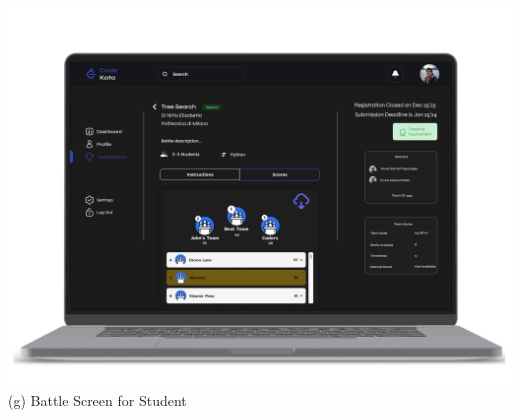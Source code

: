\begin{center}
\includegraphics[scale=0.13]{Images/ui-ux/student_battle_4.png}
      (g) Battle Screen for Student
\end{center}

